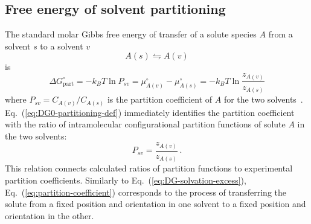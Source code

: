 \documentclass[9pt,bestpractices]{livecoms}
\begin{document}
\subsection{Free energy of solvent partitioning}\label{sec:theory-partitioning}

The standard molar Gibbs free energy of transfer of a solute species $A$ from a  solvent $s$ to a solvent $v$
\begin{equation}
A(s)  \leftrightharpoons A(v)
\end{equation}
is
\begin{equation}
  \Delta G^\circ_{\mathrm{part}} = -k_B T \ln P_{sv} = \mu^\circ_{A(v)}  - \mu^\circ_{A(s)} = -k_B T \ln \frac{z_{A(v)}}{z_{A(s)}}
  \label{eq:DG0-partitioning-def}
\end{equation}
where $P_{sv} = C_{A(v)}/C_{A(s)}$ is the partition coefficient of $A$ for the two solvents~\cite{rustenburg2016measuring}. Eq.~(\ref{eq:DG0-partitioning-def}) 
immediately identifies the partition coefficient with the ratio of intramolecular configurational partition functions of solute $A$ in the two solvents:
\begin{equation}
  P_{sv} = \frac{z_{A(v)}}{z_{A(s)}} \, .
  \label{eq:partition-coefficient}
\end{equation}
This relation connects calculated ratios of partition functions to experimental partition coefficients. Similarly to Eq.~(\ref{eq:DG-solvation-excess}), Eq.~(\ref{eq:partition-coefficient}) corresponds to the process of transferring the solute from a fixed position and orientation in one solvent to a fixed position and orientation in the other.
\end{document}
